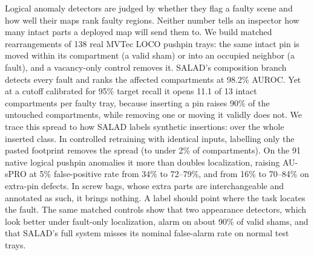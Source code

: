 Logical anomaly detectors are judged by whether they flag a faulty scene and how well their maps rank faulty regions. Neither number tells an inspector how many intact parts a deployed map will send them to. We build matched rearrangements of 138 real MVTec LOCO pushpin trays: the same intact pin is moved within its compartment (a valid sham) or into an occupied neighbor (a fault), and a vacancy-only control removes it. SALAD's composition branch detects every fault and ranks the affected compartments at 98.2\% AUROC. Yet at a cutoff calibrated for 95\% target recall it opens 11.1 of 13 intact compartments per faulty tray, because inserting a pin raises 90\% of the untouched compartments, while removing one or moving it validly does not. We trace this spread to how SALAD labels synthetic insertions: over the whole inserted class. In controlled retraining with identical inputs, labelling only the pasted footprint removes the spread (to under 2\% of compartments). On the 91 native logical pushpin anomalies it more than doubles localization, raising AU-sPRO at 5\% false-positive rate from 34\% to 72--79\%, and from 16\% to 70--84\% on extra-pin defects. In screw bags, whose extra parts are interchangeable and annotated as such, it brings nothing. A label should point where the task locates the fault. The same matched controls show that two appearance detectors, which look better under fault-only localization, alarm on about 90\% of valid shams, and that SALAD's full system misses its nominal false-alarm rate on normal test trays.
